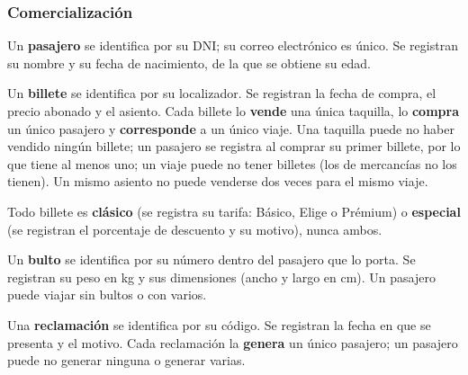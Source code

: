 \documentclass[11pt,a4paper]{article}
\DeclareRobustCommand{\_}{\textunderscore\allowbreak}
\newcommand{\RN}[1]{\textbf{RN-#1}}
\begin{document}
\subsubsection*{Comercialización}
\begin{description}[leftmargin=1.4cm,style=nextline]
\item[\RN{19}] Un \textbf{pasajero} se identifica por su DNI; su correo electrónico es único. Se registran su nombre y su fecha de nacimiento, de la que se obtiene su edad.
\item[\RN{20}] Un \textbf{billete} se identifica por su localizador. Se registran la fecha de compra, el precio abonado y el asiento. Cada billete lo \textbf{vende} una única taquilla, lo \textbf{compra} un único pasajero y \textbf{corresponde} a un único viaje. Una taquilla puede no haber vendido ningún billete; un pasajero se registra al comprar su primer billete, por lo que tiene al menos uno; un viaje puede no tener billetes (los de mercancías no los tienen). Un mismo asiento no puede venderse dos veces para el mismo viaje.
\item[\RN{21}] Todo billete es \textbf{clásico} (se registra su tarifa: Básico, Elige o Prémium) o \textbf{especial} (se registran el porcentaje de descuento y su motivo), nunca ambos.
\item[\RN{22}] Un \textbf{bulto} se identifica por su número dentro del pasajero que lo porta. Se registran su peso en kg y sus dimensiones (ancho y largo en cm). Un pasajero puede viajar sin bultos o con varios.
\item[\RN{23}] Una \textbf{reclamación} se identifica por su código. Se registran la fecha en que se presenta y el motivo. Cada reclamación la \textbf{genera} un único pasajero; un pasajero puede no generar ninguna o generar varias.
\end{description}
\end{document}
